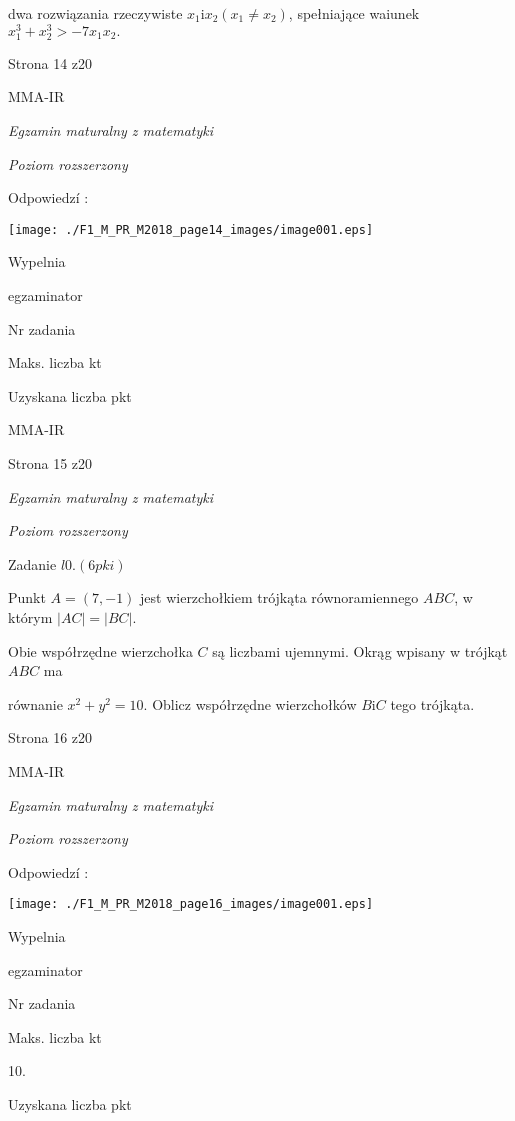 \documentclass[a4paper,12pt]{article}
\begin{document}
dwa rozwiązania rzeczywiste $x_{1} \mathrm{i}x_{2}(x_{1}\neq x_{2})$, spełniające waiunek $x_{1}^{3}+x_{2}^{3}>-7x_{1}x_{2}.$

Strona 14 z20

MMA-IR





{\it Egzamin maturalny z matematyki}

{\it Poziom rozszerzony}

Odpowiedzí :
\begin{center}
\texttt{[image: ./F1\_M\_PR\_M2018\_page14\_images/image001.eps]}
\end{center}
Wypelnia

egzaminator

Nr zadania

Maks. liczba kt

Uzyskana liczba pkt

MMA-IR

Strona 15 z20





{\it Egzamin maturalny z matematyki}

{\it Poziom rozszerzony}

Zadanie $l0. (6pki)$

Punkt $A=(7,-1)$ jest wierzchołkiem trójkąta równoramiennego $ABC$, w którym $|AC|=|BC|.$

Obie współrzędne wierzchołka $C$ są liczbami ujemnymi. Okrąg wpisany w trójkąt $ABC$ ma

równanie $x^{2}+y^{2}=10$. Oblicz współrzędne wierzchołków $B\mathrm{i}C$ tego trójkąta.

Strona 16 z20

MMA-IR





{\it Egzamin maturalny z matematyki}

{\it Poziom rozszerzony}

Odpowiedzí :
\begin{center}
\texttt{[image: ./F1\_M\_PR\_M2018\_page16\_images/image001.eps]}
\end{center}
Wypelnia

egzaminator

Nr zadania

Maks. liczba kt

10.

Uzyskana liczba pkt
\end{document}
